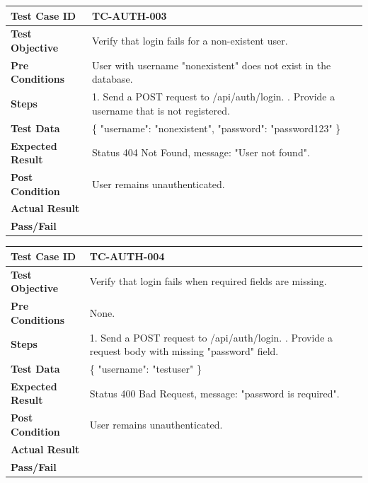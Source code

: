 \begin{longtable}{|p{}|p{}|}
\hline
\textbf{Test Case ID} & TC-AUTH-003 \\ \hline
\textbf{Test Objective} & Verify that login fails for a non-existent user. \\ \hline
\textbf{Pre Conditions} & User with username "nonexistent" does not exist in the database. \\ \hline
\textbf{Steps} & 
1. Send a POST request to /api/auth/login. \newline
2. Provide a username that is not registered. \\ \hline
\textbf{Test Data} & \{ "username": "nonexistent", "password": "password123" \} \\ \hline
\textbf{Expected Result} & Status 404 Not Found, message: "User not found". \\ \hline
\textbf{Post Condition} & User remains unauthenticated. \\ \hline
\textbf{Actual Result} &  \\ \hline
\textbf{Pass/Fail} &  \\ \hline
\end{longtable}

\begin{longtable}{|p{}|p{}|}
\hline
\textbf{Test Case ID} & TC-AUTH-004 \\ \hline
\textbf{Test Objective} & Verify that login fails when required fields are missing. \\ \hline
\textbf{Pre Conditions} & None. \\ \hline
\textbf{Steps} & 
1. Send a POST request to /api/auth/login. \newline
2. Provide a request body with missing "password" field. \\ \hline
\textbf{Test Data} & \{ "username": "testuser" \} \\ \hline
\textbf{Expected Result} & Status 400 Bad Request, message: "password is required". \\ \hline
\textbf{Post Condition} & User remains unauthenticated. \\ \hline
\textbf{Actual Result} &  \\ \hline
\textbf{Pass/Fail} &  \\ \hline
\end{longtable}

